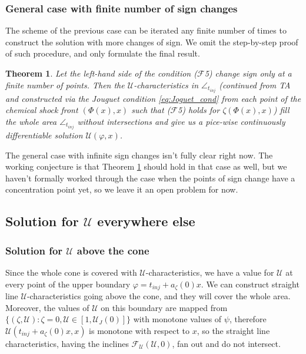 \documentclass[12pt]{article}
\newtheorem{theorem}{Theorem}
\theoremstyle{definition}
\begin{document}
\subsubsection{General case with finite number of sign changes}

The scheme of the previous case can be iterated any finite number of times to construct the solution with more changes of sign. We omit the step-by-step proof of such procedure, and only formulate the final result.

\begin{theorem}
\label{thm3}
Let the left-hand side of the condition ($\mathcal F$5) change sign only at a finite number of points. Then the $\mathcal U$-characteristics in $\angle_{t_{inj}}$ (continued from TA and constructed via the Jouguet condition \eqref{eq:Joguet_cond} from each point of the chemical shock front $(\Phi(x),x)$ such that ($\mathcal F$5) holds for $\zeta(\Phi(x),x)$) fill the whole area $\angle_{t_{inj}}$ without intersections and give us a pice-wise continuously differentiable solution $\mathcal U(\varphi, x)$.
\end{theorem}

The general case with infinite sign changes isn't fully clear right now. The working conjecture is that Theorem \ref{thm3} should hold in that case as well, but we haven't formally worked through the case when the points of sign change have a concentration point yet, so we leave it an open problem for now. 

\subsection{Solution for $\mathcal U$ everywhere else}
\subsubsection{Solution for $\mathcal U$ above the cone}
Since the whole cone is covered with $\mathcal U$-characteristics, we have a value for $\mathcal U$ at every point of the upper boundary $\varphi = t_{inj} + a_\zeta(0)x$. We can construct straight line $\mathcal U$-characteristics going above the cone, and they will cover the whole area. Moreover, the values of $\mathcal U$ on this boundary are mapped from $\{(\zeta, \mathcal U): \zeta=0, \mathcal U\in[1, \mathcal U_J(0)]\}$ with monotone values of $\psi$, therefore $\mathcal U(t_{inj} + a_\zeta(0)x, x)$ is monotone with respect to $x$, so the straight line characteristics, having the inclines $\mathcal F_{\mathcal U}(\mathcal U, 0)$, fan out and do not intersect.
\end{document}
